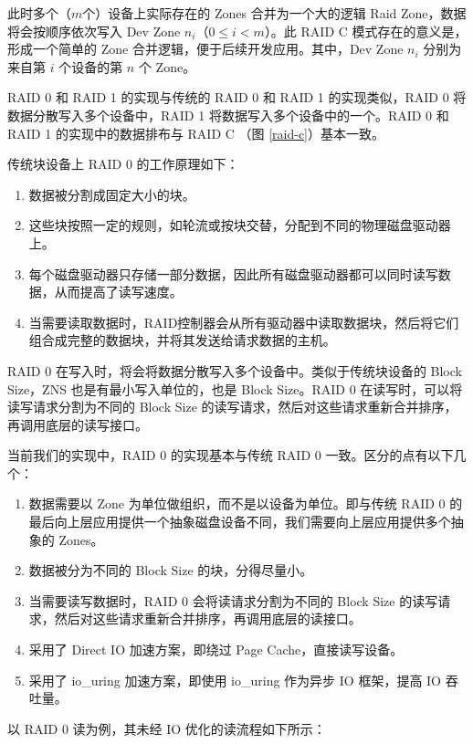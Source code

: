 此时多个（$m$个）设备上实际存在的 Zones 合并为一个大的逻辑 Raid Zone，数据将会按顺序依次写入 Dev Zone $n_{i}$（$0 \le i < m$）。此 RAID C 模式存在的意义是，形成一个简单的 Zone 合并逻辑，便于后续开发应用。其中，Dev Zone $n_i$ 分别为来自第 $i$ 个设备的第 $n$ 个 Zone。

RAID 0 和 RAID 1 的实现与传统的 RAID 0 和 RAID 1 的实现类似，RAID 0 将数据分散写入多个设备中，RAID 1 将数据写入多个设备中的一个。RAID 0 和 RAID 1 的实现中的数据排布与 RAID C （图 \ref{raid-c}）基本一致。

传统块设备上 RAID 0 的工作原理如下：\cite{chen_raid_1994}

\begin{enumerate}
  \item 数据被分割成固定大小的块。
  \item 这些块按照一定的规则，如轮流或按块交替，分配到不同的物理磁盘驱动器上。
  \item 每个磁盘驱动器只存储一部分数据，因此所有磁盘驱动器都可以同时读写数据，从而提高了读写速度。
  \item 当需要读取数据时，RAID控制器会从所有驱动器中读取数据块，然后将它们组合成完整的数据块，并将其发送给请求数据的主机。
\end{enumerate}

RAID 0 在写入时，将会将数据分散写入多个设备中。类似于传统块设备的 Block Size，ZNS 也是有最小写入单位的，也是 Block Size。RAID 0 在读写时，可以将读写请求分割为不同的 Block Size 的读写请求，然后对这些请求重新合并排序，再调用底层的读写接口。

当前我们的实现中，RAID 0 的实现基本与传统 RAID 0 一致。区分的点有以下几个：

\begin{enumerate}
  \item 数据需要以 Zone 为单位做组织，而不是以设备为单位。即与传统 RAID 0 的最后向上层应用提供一个抽象磁盘设备不同，我们需要向上层应用提供多个抽象的 Zones。
  \item 数据被分为不同的 Block Size 的块，分得尽量小。
  \item 当需要读写数据时，RAID 0 会将读请求分割为不同的 Block Size 的读写请求，然后对这些请求重新合并排序，再调用底层的读接口。
  \item 采用了 Direct IO 加速方案，即绕过 Page Cache，直接读写设备。
  \item 采用了 io\_uring 加速方案，即使用 io\_uring 作为异步 IO 框架，提高 IO 吞吐量。
\end{enumerate}

以 RAID 0 读为例，其未经 IO 优化的读流程如下所示：

